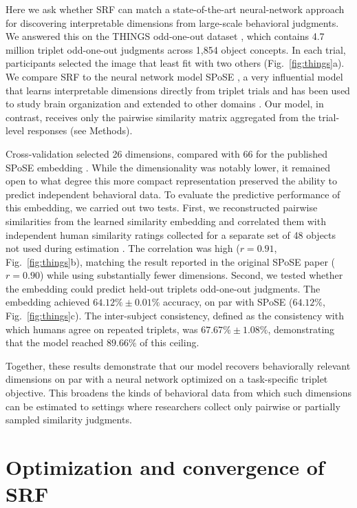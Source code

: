 \documentclass{article}
\begin{document}
Here we ask whether SRF can match a state-of-the-art neural-network approach for discovering interpretable dimensions from large-scale behavioral judgments. We answered this on the THINGS odd-one-out dataset \citep{Hebart2023}, which contains 4.7 million triplet odd-one-out judgments across 1{,}854 object concepts. In each trial, participants selected the image that least fit with two others (Fig.~\ref{fig:things}a). We compare SRF to the neural network model SPoSE \citep{Hebart2020}, a very influential model that learns interpretable dimensions directly from triplet trials and has been used to study brain organization \citep{Contier2024,Teichmann2026} and extended to other domains \citep{Josephs2023,Bockes2025}. Our model, in contrast, receives only the pairwise similarity matrix aggregated from the trial-level responses (see Methods).

Cross-validation selected 26 dimensions, compared with 66 for the published SPoSE embedding \citep{Hebart2023}. While the dimensionality was notably lower, it remained open to what degree this more compact representation preserved the ability to predict independent behavioral data. To evaluate the predictive performance of this embedding, we carried out two tests. First, we reconstructed pairwise similarities from the learned similarity embedding and correlated them with independent human similarity ratings collected for a separate set of 48 objects not used during estimation \citep{Hebart2020}. The correlation was high ($r = 0.91$, Fig.~\ref{fig:things}b), matching the result reported in the original SPoSE paper ($r = 0.90$) while using substantially fewer dimensions. Second, we tested whether the embedding could predict held-out triplets odd-one-out judgments. The embedding achieved $64.12\% \pm 0.01\%$ accuracy, on par with SPoSE ($64.12\%$, Fig.~\ref{fig:things}c). The inter-subject consistency, defined as the consistency with which humans agree on repeated triplets, was $67.67\% \pm 1.08\%$, demonstrating that the model reached $89.66\%$ of this ceiling.

Together, these results demonstrate that our model recovers behaviorally relevant dimensions on par with a neural network optimized on a task-specific triplet objective. This broadens the kinds of behavioral data from which such dimensions can be estimated to settings where researchers collect only pairwise or partially sampled similarity judgments.


\section{Optimization and convergence of SRF}\label{sec:srf-optim}
\end{document}
